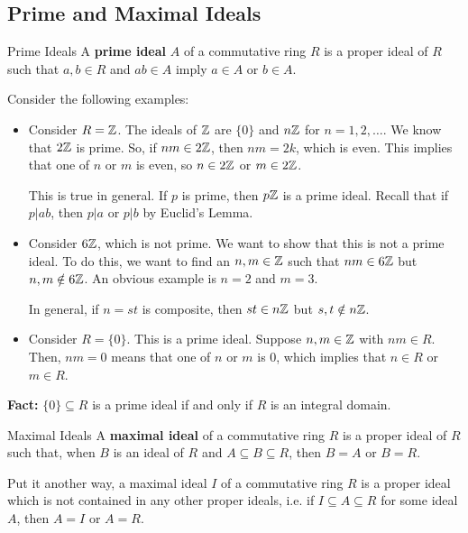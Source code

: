 \documentclass[letterpaper]{article}
\begin{document}
\subsection{Prime and Maximal Ideals}
\begin{definition}{Prime Ideals}{}
    A \textbf{prime ideal} $A$ of a commutative ring $R$ is a proper ideal of $R$ such that $a, b \in R$ and $ab \in A$ imply $a \in A$ or $b \in A$. 
\end{definition}
Consider the following examples:
\begin{itemize}
    \item Consider $R = \mathbb{Z}$. The ideals of $\mathbb{Z}$ are $\{0\}$ and $n\mathbb{Z}$ for $n = 1, 2, \dots$. We know that $2\mathbb{Z}$ is prime. So, if $nm \in 2\mathbb{Z}$, then $nm = 2k$, which is even. This implies that one of $n$ or $m$ is even, so $n \in 2\mathbb{Z}$ or $m \in 2\mathbb{Z}$. 

    \bigskip 
    
    This is true in general. If $p$ is prime, then $p\mathbb{Z}$ is a prime ideal. Recall that if $p | ab$, then $p | a$ or $p | b$ by Euclid's Lemma. 

    \item Consider $6\mathbb{Z}$, which is not prime. We want to show that this is not a prime ideal. To do this, we want to find an $n, m \in \mathbb{Z}$ such that $nm \in 6\mathbb{Z}$ but $n, m \notin 6\mathbb{Z}$. An obvious example is $n = 2$ and $m = 3$. 
    
    \bigskip
    
    In general, if $n = st$ is composite, then $st \in n\mathbb{Z}$ but $s, t \notin n\mathbb{Z}$. 

    \item Consider $R = \{0\}$. This is a prime ideal. Suppose $n, m \in \mathbb{Z}$ with $nm \in R$. Then, $nm = 0$ means that one of $n$ or $m$ is 0, which implies that $n \in R$ or $m \in R$. 
\end{itemize}
\textbf{Fact:} $\{0\} \subseteq R$ is a prime ideal if and only if $R$ is an integral domain. 

\begin{definition}{Maximal Ideals}{}
    A \textbf{maximal ideal} of a commutative ring $R$ is a proper ideal of $R$ such that, when $B$ is an ideal of $R$ and $A \subseteq B \subseteq R$, then $B = A$ or $B = R$. 
    
    \bigskip

    Put it another way, a maximal ideal $I$ of a commutative ring $R$ is a proper ideal which is not contained in any other proper ideals, i.e. if $I \subseteq A \subseteq R$ for some ideal $A$, then $A = I$ or $A = R$. 
\end{definition}
\end{document}

